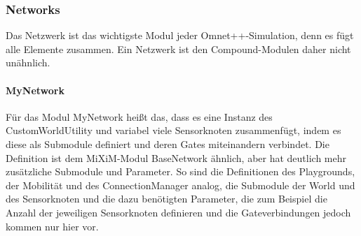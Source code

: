\subsubsection{Networks}

Das Netzwerk ist das wichtigste Modul jeder Omnet++-Simulation, denn es fügt alle Elemente zusammen. Ein Netzwerk ist den Compound-Modulen daher nicht unähnlich. 

\paragraph{MyNetwork}

Für das Modul MyNetwork heißt das, dass es eine Instanz des CustomWorldUtility und variabel viele Sensorknoten zusammenfügt, indem es diese als Submodule definiert und deren Gates miteinandern verbindet. Die Definition ist dem MiXiM-Modul BaseNetwork ähnlich, aber hat deutlich mehr zusätzliche Submodule und Parameter. \newline
So sind die Definitionen des Playgrounds, der Mobilität und des ConnectionManager analog, die Submodule der World und des Sensorknoten und die dazu benötigten Parameter, die zum Beispiel die Anzahl der jeweiligen Sensorknoten definieren und die Gateverbindungen jedoch kommen nur hier vor.

